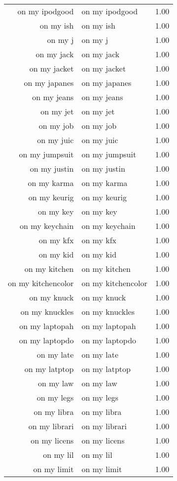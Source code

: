 \begin{table}[ht]
\begin{tabular}{rlr}
  on my ipodgood & on my ipodgood & 1.00 \\ 
  on my ish & on my ish & 1.00 \\ 
  on my j & on my j & 1.00 \\ 
  on my jack & on my jack & 1.00 \\ 
  on my jacket & on my jacket & 1.00 \\ 
  on my japanes & on my japanes & 1.00 \\ 
  on my jeans & on my jeans & 1.00 \\ 
  on my jet & on my jet & 1.00 \\ 
  on my job & on my job & 1.00 \\ 
  on my juic & on my juic & 1.00 \\ 
  on my jumpsuit & on my jumpsuit & 1.00 \\ 
  on my justin & on my justin & 1.00 \\ 
  on my karma & on my karma & 1.00 \\ 
  on my keurig & on my keurig & 1.00 \\ 
  on my key & on my key & 1.00 \\ 
  on my keychain & on my keychain & 1.00 \\ 
  on my kfx & on my kfx & 1.00 \\ 
  on my kid & on my kid & 1.00 \\ 
  on my kitchen & on my kitchen & 1.00 \\ 
  on my kitchencolor & on my kitchencolor & 1.00 \\ 
  on my knuck & on my knuck & 1.00 \\ 
  on my knuckles & on my knuckles & 1.00 \\ 
  on my laptopah & on my laptopah & 1.00 \\ 
  on my laptopdo & on my laptopdo & 1.00 \\ 
  on my late & on my late & 1.00 \\ 
  on my latptop & on my latptop & 1.00 \\ 
  on my law & on my law & 1.00 \\ 
  on my legs & on my legs & 1.00 \\ 
  on my libra & on my libra & 1.00 \\ 
  on my librari & on my librari & 1.00 \\ 
  on my licens & on my licens & 1.00 \\ 
  on my lil & on my lil & 1.00 \\ 
  on my limit & on my limit & 1.00 \\ 

\end{tabular}
\end{table}
